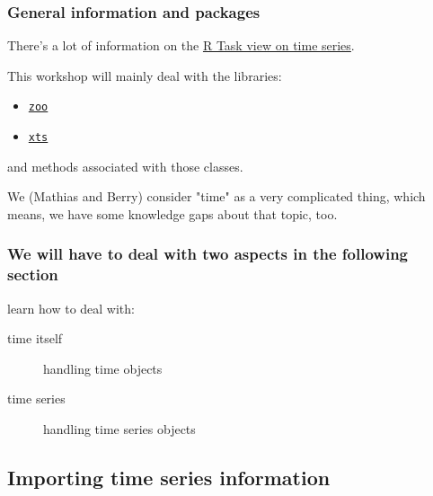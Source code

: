 \documentclass[xcolor=table, xcolor=dvipsnames]{beamer}\usepackage[]{graphicx}\usepackage[]{color}
\begin{document}
\begin{frame}\frametitle{General information and packages}
  There's a lot of information on the \href{http://cran.r-project.org/web/views/TimeSeries.html}{R Task view on time series}.

  \vspace{2em}

	This workshop will mainly deal with the libraries: 
	\begin{itemize}
		\item \href{http://cran.r-project.org/web/packages/zoo/index.html}{\texttt{zoo}} 
		\item \href{http://cran.r-project.org/web/packages/xts/index.html}{\texttt{xts}}
	\end{itemize}
	and methods associated with those classes.

	\vspace{2em}

	We (Mathias and Berry) consider "time" as a very complicated thing, which
	means, we have some knowledge gaps about that topic, too.

\end{frame}


\begin{frame}\frametitle{We will have to deal with two aspects in the following section}
  learn how to deal with:
  \begin{description}
  \item[time itself]{handling time objects}
  \item[time series]{handling time series objects}
  \end{description}
\end{frame}

\subsection{Importing time series information}
\end{document}
